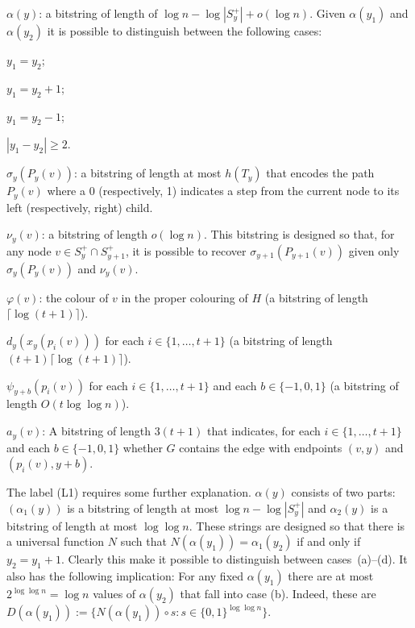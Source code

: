 \documentclass{patmorin}
\begin{document}
\begin{compactenum}[(L1)]
    \item $\alpha(y)$: a bitstring of length of $\log n-\log |S^+_y|+o(\log n)$.  Given $\alpha(y_1)$ and $\alpha(y_2)$ it is possible to distinguish between the following cases:
    \begin{inparaenum}
        \item $y_1=y_2$;
        \item $y_1=y_2+1$;
        \item $y_1=y_2-1$;
        \item $|y_1-y_2|\ge 2$.
    \end{inparaenum}

    \item $\sigma_y(P_y(v))$: a bitstring of length at most $h(T_y)$ that encodes the path $P_y(v)$ where a 0 (respectively, 1) indicates a step from the current node to its left (respectively, right) child.

    \item $\nu_y(v)$: a bitstring of length $o(\log n)$.  This bitstring is designed so that, for any node $v\in S^+_y\cap S^+_{y+1}$, it is possible to recover $\sigma_{y+1}(P_{y+1}(v))$ given only $\sigma_y(P_y(v))$ and $\nu_y(v)$.

    \item $\varphi(v)$: the colour of $v$ in the proper colouring of $H$ (a bitstring of length $\lceil\log(t+1)\rceil$).

    \item $d_y(x_y(p_i(v)))$ for each $i\in\{1,\ldots,t+1\}$ (a bitstring of length $(t+1)\lceil\log(t+1)\rceil$).

    \item $\psi_{y+b}(p_i(v))$ for each $i\in\{1,\ldots,t+1\}$ and each $b\in\{-1,0,1\}$ (a bitstring of length $O(t\log\log n)$).\label{psi}

    \item $a_y(v)$: A bitstring of length $3(t+1)$ that indicates, for each $i\in\{1,\ldots,t+1\}$ and each $b\in\{-1,0,1\}$ whether $G$ contains the edge with endpoints $(v,y)$ and $(p_i(v),y+b)$.
\end{compactenum}

The label (L1) requires some further explanation. $\alpha(y)$ consists of two parts: $(\alpha_1(y))$ is a bitstring of length at most $\log n-\log |S^+_y|$ and $\alpha_2(y)$ is a bitstring of length at most $\log\log n$.  These strings are designed so that there is a universal function $N$ such that $N(\alpha(y_1))=\alpha_1(y_2)$ if and only if $y_2=y_1+1$.  Clearly this make it possible to distinguish between cases~(a)--(d).  It also has the following implication:  For any fixed $\alpha(y_1)$ there are at most $2^{\log \log n}=\log n$ values of $\alpha(y_2)$ that fall into case (b).  Indeed, these are $D(\alpha(y_1)):=\{N(\alpha(y_1))\mathbin{\circ} s: s\in\{0,1\}^{\log\log n}\}$.
\end{document}
